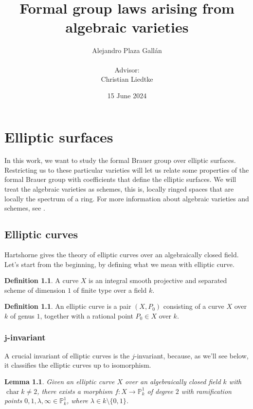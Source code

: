 \documentclass{report}
\title{Formal group laws arising from algebraic varieties}
\author{Alejandro Plaza Gall\'{a}n\\\\Advisor:\\Christian Liedtke}
\date{15 June 2024}
\DeclareMathOperator{\chara}{char}
\newtheorem{lemma}[equation]{Lemma}
\theoremstyle{definition}
\newtheorem{definition}[equation]{Definition}
\begin{document}
\maketitle

\tableofcontents
\newpage

\chapter{Elliptic surfaces}

In this work, we want to study the formal Brauer group over elliptic surfaces. Restricting us to these particular varieties will let us relate some properties of the formal Brauer group with coefficients that define the elliptic surfaces. We will treat the algebraic varieties as schemes, this is, locally ringed spaces that are locally the spectrum of a ring. For more information about algebraic varieties and schemes, see \cite{hartshorne1977algebraic}.

\section{Elliptic curves}

Hartshorne \cite[Section~IV.4]{hartshorne1977algebraic} gives the theory of elliptic curves over an algebraically closed field. Let's start from the beginning, by defining what we mean with elliptic curve.

\begin{definition}
A curve $X$ is an integral smooth projective and separated scheme of dimension $1$ of finite type over a field $k$.
\end{definition}

\begin{definition}
An elliptic curve is a pair $(X,P_0)$ consisting of a curve $X$ over $k$ of genus $1$, together with a rational point $P_0\in X$ over $k$.
\end{definition}

\subsection[\texorpdfstring{$j$}{j}-invariant]{\textbf{\texorpdfstring{$\boldsymbol{j}$}{j}-invariant}}

A crucial invariant of elliptic curves is the $j$-invariant, because, as we'll see below, it classifies the elliptic curves up to isomorphism.

\begin{lemma}
\label{Lem:lambdarama}
Given an elliptic curve $X$ over an algebraically closed field $k$ with $\chara k\neq2$, there exists a morphism $f:X\rightarrow\mathbb{P}_k^1$ of degree $2$ with ramification points $0,1,\lambda,\infty\in\mathbb{P}_k^1$, where $\lambda\in k\setminus\{0,1\}$.
\end{lemma}
\end{document}
